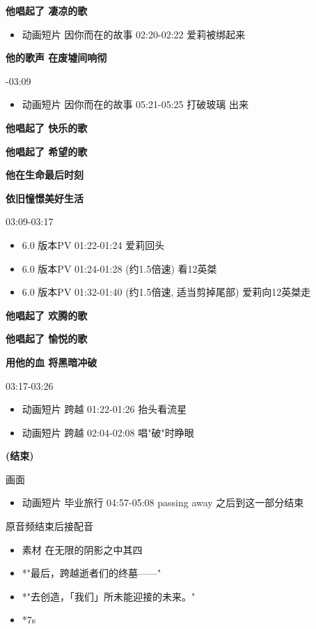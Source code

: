 \documentclass[a4paper]{article}
\begin{document}
\textbf{他唱起了 凄凉的歌}

\begin{itemize}
    \item 动画短片 因你而在的故事 02:20-02:22 爱莉被绑起来
\end{itemize}

\textbf{他的歌声 在废墟间响彻}

-03:09

\begin{itemize}
    \item 动画短片 因你而在的故事 05:21-05:25 打破玻璃 出来
\end{itemize}

\textbf{他唱起了 快乐的歌}

\textbf{他唱起了 希望的歌}

\textbf{他在生命最后时刻}

\textbf{依旧憧憬美好生活}

03:09-03:17

\begin{itemize}
    \item 6.0 版本PV 01:22-01:24 爱莉回头
    \item 6.0 版本PV 01:24-01:28 (约1.5倍速) 看12英桀
    \item 6.0 版本PV 01:32-01:40 (约1.5倍速, 适当剪掉尾部) 爱莉向12英桀走
\end{itemize}

\textbf{他唱起了 欢腾的歌}

\textbf{他唱起了 愉悦的歌}

\textbf{用他的血 将黑暗冲破}

03:17-03:26

\begin{itemize}
    \item 动画短片 跨越 01:22-01:26 抬头看流星
    \item 动画短片 跨越 02:04-02:08 唱"破"时睁眼
\end{itemize}

\textbf{(结束)}

画面

\begin{itemize}
    \item 动画短片 毕业旅行 04:57-05:08 passing away 之后到这一部分结束
\end{itemize}

原音频结束后接配音

\begin{itemize}
    \item 素材 在无限的阴影之中其四
    \item *"最后，跨越逝者们的终墓——"
    \item *"去创造，「我们」所未能迎接的未来。"
    \item *7s
\end{itemize}
\end{document}
